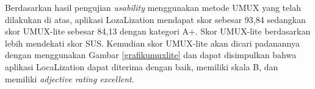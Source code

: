 \par Berdasarkan hasil pengujian \textit{usability} menggunakan metode UMUX yang telah dilakukan di atas, aplikasi LozaLization mendapat skor sebesar 93,84 sedangkan skor UMUX-lite sebesar 84,13 dengan kategori A+. Skor UMUX-lite berdasarkan \citep{Borsci2015} lebih mendekati skor SUS. Kemudian skor UMUX-lite akan dicari padanannya dengan menggunakan Gambar \ref{grafikumuxlite} dan dapat disimpulkan bahwa aplikasi LocaLization dapat diterima dengan baik, memiliki skala B, dan memiliki \textit{adjective rating excellent}.

